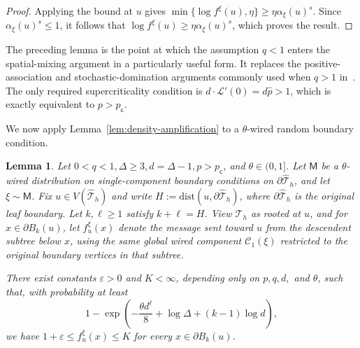 \documentclass[11pt]{amsart}
\theoremstyle{plain}
\newtheorem{lemma}[theorem]{Lemma}
\theoremstyle{definition}
\theoremstyle{remark}
\newcommand{\dreg}{\widehat {\mathcal T}_h}
\newcommand{\pc}{p_{\mathsf{c}}}
\newcommand{\dist}{\mathrm{dist}}
\begin{document}
\begin{proof}
Applying the bound at $u$ gives $\min\{\log f^\xi(u),\eta\}\ge\eta\alpha_\xi(u)^s$. Since $\alpha_\xi(u)^s\le1$, it follows that $\log f^\xi(u)\ge\eta\alpha_\xi(u)^s$, which proves the result.
\end{proof}

The preceding lemma is the point at which the assumption $q<1$ enters the spatial-mixing argument in a particularly useful form. It replaces the positive-association and stochastic-domination arguments commonly used when $q>1$ in~\cite[Lemma 2.8]{blanca2026uniqueness}. The only required supercriticality condition is $d\cdot \mathcal L'(0) = d\widehat p >1$, which is exactly equivalent to $p>\pc$.

We now apply Lemma~\ref{lem:density-amplification} to a $\theta$-wired random boundary condition.

\begin{lemma}
\label{lem:uniform-positive}
Let $0<q<1, \Delta\ge3, d=\Delta-1, p>\pc$, and $\theta\in(0,1]$. Let $\mathsf M$ be a $\theta$-wired distribution on single-component boundary conditions on $\partial\dreg$, and let $\xi\sim\mathsf M$. Fix $u\in V(\dreg)$ and write $H:=\dist(u,\partial\dreg)$, where $\partial\dreg$ is the original leaf boundary. Let $k,\ell\ge1$ satisfy $k+\ell=H$. View $\dreg$ as rooted at $u$, and for $x\in\partial B_k(u)$, let $f_u^\xi(x)$ denote the message sent toward $u$ from the descendent subtree below $x$, using the same global wired component $\mathcal C_1(\xi)$ restricted to the original boundary vertices in that subtree.

There exist constants $\varepsilon>0$ and $K<\infty$, depending only on $p,q,d,$ and $\theta$, such that, with probability at least 
\[
    1-
    \exp\left(
        -\frac{\theta d^\ell}8
        +\log\Delta
        +(k-1)\log d
    \right),
\]
we have $1+\varepsilon \le f_u^\xi(x) \le K$ for every $x\in\partial B_k(u)$.
\end{lemma}
\end{document}
